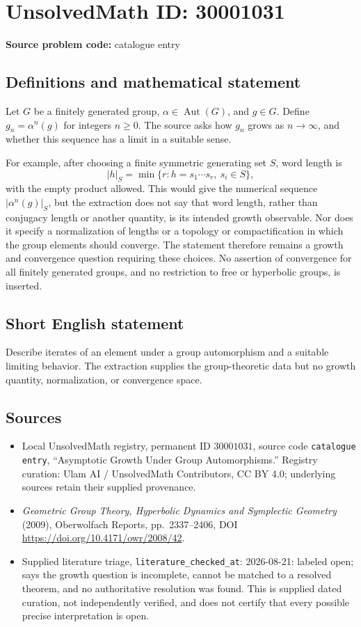 \documentclass[11pt]{article}
\begin{document}
\section*{UnsolvedMath ID: 30001031}
\textbf{Source problem code:} catalogue entry
\subsection{Definitions and mathematical statement}
Let \(G\) be a finitely generated group, \(\alpha\in\operatorname{Aut}(G)\), and \(g\in G\). Define \(g_n=\alpha^n(g)\) for integers \(n\geq0\). The source asks how \(g_n\) grows as \(n\to\infty\), and whether this sequence has a limit in a suitable sense.

For example, after choosing a finite symmetric generating set \(S\), word length is
\[
|h|_S=\min\{r:h=s_1\cdots s_r,\ s_i\in S\},
\]
with the empty product allowed. This would give the numerical sequence \(|\alpha^n(g)|_S\), but the extraction does not say that word length, rather than conjugacy length or another quantity, is its intended growth observable. Nor does it specify a normalization of lengths or a topology or compactification in which the group elements should converge. The statement therefore remains a growth and convergence question requiring these choices. No assertion of convergence for all finitely generated groups, and no restriction to free or hyperbolic groups, is inserted.
\subsection{Short English statement}
Describe iterates of an element under a group automorphism and a suitable limiting behavior. The extraction supplies the group-theoretic data but no growth quantity, normalization, or convergence space.
\subsection{Sources}
\begin{itemize}
\item Local UnsolvedMath registry, permanent ID \(30001031\), source code \texttt{catalogue entry}, ``Asymptotic Growth Under Group Automorphisms.'' Registry curation: Ulam AI / UnsolvedMath Contributors, CC BY 4.0; underlying sources retain their supplied provenance.
\item \emph{Geometric Group Theory, Hyperbolic Dynamics and Symplectic Geometry} (2009), Oberwolfach Reports, pp.\ 2337--2406, DOI \url{https://doi.org/10.4171/owr/2008/42}.
\item Supplied literature triage, \texttt{literature\_checked\_at}: 2026-08-21: labeled open; says the growth question is incomplete, cannot be matched to a resolved theorem, and no authoritative resolution was found. This is supplied dated curation, not independently verified, and does not certify that every possible precise interpretation is open.
\end{itemize}
\end{document}
